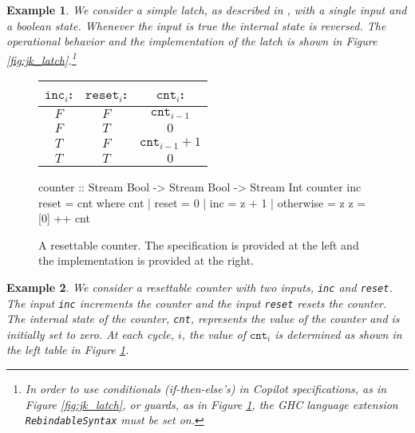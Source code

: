 \documentclass[]{article}
\theoremstyle{example}
\newtheorem{example}{Example}
\begin{document}
\begin{example}
We consider a simple latch, as described in \cite{Farhat2004}, with a single
input and a boolean state. Whenever the input is true the internal state is reversed.
The operational behavior and the implementation of the latch is shown in Figure
\ref{fig:jk_latch}.\footnote
{In order
to use conditionals (if-then-else's) in Copilot specifications,
as in Figure \ref{fig:jk_latch},
or guards, as in Figure \ref{fig:counter}, the GHC
language extension {\tt RebindableSyntax} must be set on.}
\end{example}

\begin{figure}
\begin{minipage}{0.4\linewidth}
\begin{tabular}{c|c||c}
$\mathtt{inc}_i$: & $\mathtt{reset}_i$: & $\mathtt{cnt}_i$: \\
\hline
$F$ & $F$ & $\mathtt{cnt}_{i-1}$ \\
\hline
$F$ & $T$ & $0$ \\
\hline
$T$ & $F$ & $\mathtt{cnt}_{i-1} + 1$ \\
\hline
$T$ & $T$ & $0$
\end{tabular}
\end{minipage}
\hspace{1cm}
\begin{minipage}{0.6\linewidth}
\begin{code}
counter :: Stream Bool -> Stream Bool 
        -> Stream Int
counter inc reset = cnt
  where
    cnt | reset     = 0
        | inc       = z + 1
        | otherwise = z
    z = [0] ++ cnt
\end{code}
\end{minipage}
\caption{A resettable counter. The specification is provided at the left and the
implementation is provided at the right.
}
\label{fig:counter}
\end{figure}

\begin{example}
We consider a resettable counter with two inputs, {\tt inc} and {\tt reset}.
The input {\tt inc} increments the counter and the input {\tt reset} resets the
counter. The internal state of the counter, {\tt cnt}, represents the value of the
counter and is initially set to zero. At each cycle, $i$, the value of
$\mathtt{cnt}_i$ is determined as shown in the left table in Figure
\ref{fig:counter}.
\end{example}

\end{document}
